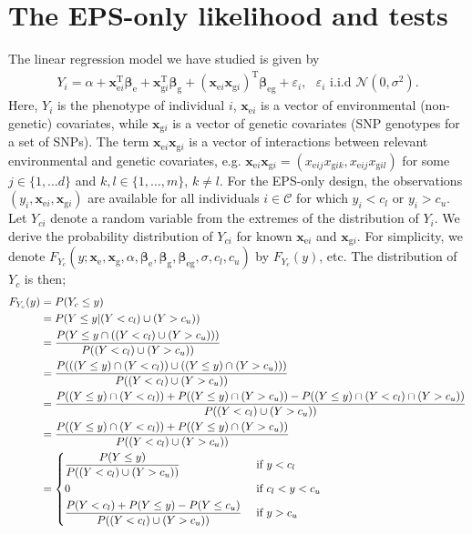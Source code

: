 \documentclass[10pt,a4paper]{article}
\def\bbetag{\bm{\beta}_{\text{g}}}
\def\bbetae{\bm{\beta}_{\text{e}}}
\def\bbetaeg{\bm{\beta}_{\text{eg}}}
\def\bxgi{\mathbf{x}_{\text{g}i}}
\def\bxei{\mathbf{x}_{\text{e}i}}
\def\bxg{\mathbf{x}_{\text{g}}}
\def\bxe{\mathbf{x}_{\text{e}}}
\begin{document}
\section{The EPS-only likelihood and tests}
 \label{app:epsonly}
The linear regression model we have studied is given by
\begin{align}
	Y_i = \alpha + \bxei^{\text{T}} \bbetae + \bxgi^{\text{T}} \bbetag + (\bxei \bxgi)^{\text{T}} \bbetaeg + \varepsilon_i, \text{ } \varepsilon_i \text{ i.i.d } \mathcal{N}(0,\sigma^2).
	\label{eq:lma}
\end{align}
Here, $Y_i$ is the phenotype of individual $i$, $\bxei$ is a vector of environmental (non-genetic) covariates, while $\bxgi$ is a vector of genetic covariates (SNP genotypes for a set of SNPs). The term $\bxei \bxgi$ is a vector of interactions between relevant environmental and genetic covariates, e.g. $\bxei \bxgi = (x_{\text{e}ij} x_{\text{g}ik}, x_{\text{e}ij} x_{\text{g}il})$ for some $j \in \{1,\ldots d\}$ and $k,l \in \{1,\ldots,m\}$, $k \neq l$. For the EPS-only design, the observations $(y_i, \bxei, \bxgi)$ are available for all individuals $i \in \mathcal{C}$ for which $y_i < c_l$ or $y_i > c_u$. Let $Y_{ci}$ denote a random variable from the extremes of the distribution of $Y_i$. We derive the probability distribution of $Y_{ci}$ for known $\bxei$ and $\bxgi$. For simplicity, we denote $F_{Y_c}(y; \bxe, \bxg , \alpha, \bbetae, \bbetag, \bbetaeg, \sigma, c_l, c_u)$ by $F_{Y_c}(y)$, etc. The distribution of $Y_c$ is then;
\begin{align*}
F_{Y_c}(y)
		& =  P(Y_c \leq y) \\
		& = P(Y \leq y | (Y<c_l) \cup (Y > c_u)) \\
		& = \frac{P(Y \leq y \cap ((Y<c_l) \cup (Y>c_u)))}{P( (Y<c_l) \cup (Y > c_u))} \\
		& = \frac{P(((Y \leq y) \cap (Y<c_l)) \cup ((Y \leq y) \cap (Y>c_u)))}{P( (Y<c_l) \cup (Y > c_u))} \\
		& = \frac{P((Y \leq y) \cap (Y<c_l)) + P((Y \leq y) \cap (Y>c_u)) - P((Y \leq y) \cap(Y < c_l) \cap (Y>c_u))}{P( (Y<c_l) \cup (Y > c_u))} \\
		&= \frac{P((Y \leq y) \cap (Y<c_l)) + P((Y \leq y) \cap (Y>c_u)) }{P( (Y<c_l) \cup (Y > c_u))} \\
		&= \begin{dcases}
		\frac{P(Y \leq y)}{P( (Y<c_l) \cup (Y > c_u))} & \text{ if } y < c_l \\
		0 & \text{ if } c_l < y < c_u \\
		\frac{P(Y<c_l) + P(Y \leq y) - P(Y \leq c_u) }{P( (Y<c_l) \cup (Y > c_u))} & \text{ if } y > c_u \\
		\end{dcases}
\end{align*}
\end{document}
